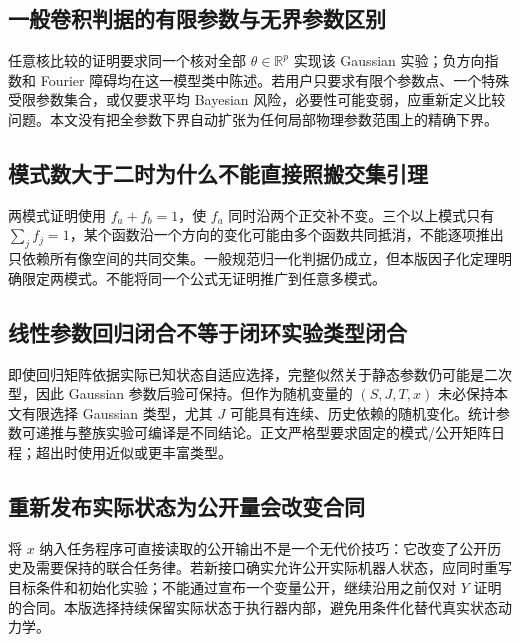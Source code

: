 \documentclass[UTF8,fontset=fandol,11pt,a4paper]{ctexart}
\newcommand{\R}{\mathbb R}\newcommand{\N}{\mathcal N}\newcommand{\E}{\mathbb E}
\theoremstyle{definition}\newtheorem{definition}[theorem]{定义}\newtheorem{assumption}[theorem]{条件}
\numberwithin{equation}{section}
\begin{document}
\subsection{一般卷积判据的有限参数与无界参数区别}
任意核比较的证明要求同一个核对全部 $\theta\in\R^p$ 实现该 Gaussian 实验；负方向指数和 Fourier 障碍均在这一模型类中陈述。若用户只要求有限个参数点、一个特殊受限参数集合，或仅要求平均 Bayesian 风险，必要性可能变弱，应重新定义比较问题。本文没有把全参数下界自动扩张为任何局部物理参数范围上的精确下界。

\subsection{模式数大于二时为什么不能直接照搬交集引理}
两模式证明使用 $f_a+f_b=1$，使 $f_a$ 同时沿两个正交补不变。三个以上模式只有 $\sum_jf_j=1$，某个函数沿一个方向的变化可能由多个函数共同抵消，不能逐项推出只依赖所有像空间的共同交集。一般规范归一化判据仍成立，但本版因子化定理明确限定两模式。不能将同一个公式无证明推广到任意多模式。

\subsection{线性参数回归闭合不等于闭环实验类型闭合}
即使回归矩阵依据实际已知状态自适应选择，完整似然关于静态参数仍可能是二次型，因此 Gaussian 参数后验可保持。但作为随机变量的 $(S,J,T,x)$ 未必保持本文有限选择 Gaussian 类型，尤其 $J$ 可能具有连续、历史依赖的随机变化。统计参数可递推与整族实验可编译是不同结论。正文严格型要求固定的模式/公开矩阵日程；超出时使用近似或更丰富类型。

\subsection{重新发布实际状态为公开量会改变合同}
将 $x$ 纳入任务程序可直接读取的公开输出不是一个无代价技巧：它改变了公开历史及需要保持的联合任务律。若新接口确实允许公开实际机器人状态，应同时重写目标条件和初始化实验；不能通过宣布一个变量公开，继续沿用之前仅对 $Y$ 证明的合同。本版选择持续保留实际状态于执行器内部，避免用条件化替代真实状态动力学。
\end{document}
